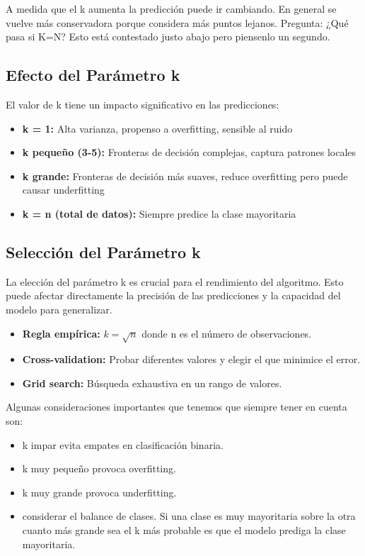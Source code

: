\documentclass[12pt]{article}
\begin{document}
A medida que el k aumenta la predicción puede ir cambiando. En general se vuelve más conservadora porque considera más puntos lejanos. Pregunta: ¿Qué pasa si K=N? Esto está contestado justo abajo pero piensenlo un segundo.

\subsection{Efecto del Parámetro k}

El valor de k tiene un impacto significativo en las predicciones:

\begin{itemize}
    \item \textbf{k = 1:} Alta varianza, propenso a overfitting, sensible al ruido
    \item \textbf{k pequeño (3-5):} Fronteras de decisión complejas, captura patrones locales
    \item \textbf{k grande:} Fronteras de decisión más suaves, reduce overfitting pero puede causar underfitting
    \item \textbf{k = n (total de datos):} Siempre predice la clase mayoritaria
\end{itemize}

\subsection{Selección del Parámetro k}

La elección del parámetro k es crucial para el rendimiento del algoritmo. Esto puede afectar directamente la precisión de las predicciones y la capacidad del modelo para generalizar.

\begin{itemize}
    \item \textbf{Regla empírica:} $k = \sqrt{n}$ donde n es el número de observaciones.
    \item \textbf{Cross-validation:} Probar diferentes valores y elegir el que minimice el error.
    \item \textbf{Grid search:} Búsqueda exhaustiva en un rango de valores.
\end{itemize}

Algunas consideraciones importantes que tenemos que siempre tener en cuenta son:

\begin{itemize}
    \item k impar evita empates en clasificación binaria.
    \item k muy pequeño provoca overfitting.
    \item k muy grande provoca underfitting.
    \item considerar el balance de clases. Si una clase es muy mayoritaria sobre la otra cuanto más grande sea el k más probable es que el modelo prediga la clase mayoritaria.
\end{itemize}
\end{document}
